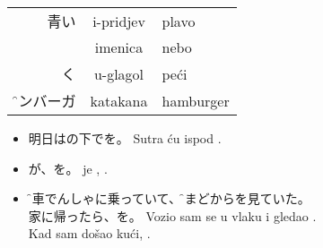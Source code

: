 \documentclass[pig]{grampig}
\begin{document}
	\begin{minipage}{\width}
		\onehalfspacing
%		
%		
%		
		
		\begin{table}
			\centering
			\textsc{} \br
			\begin{tabular}{RCl}
				青い & i-pridjev & plavo \\
				 & imenica & nebo \\
				く & u-glagol & peći \\
				\f{ハンバーガ}{\strut} & katakana & hamburger \\
			\end{tabular}
		\end{table} \vspace{-1em}
		
		\singlespacing
		\begin{itemize}
			\item 明日はの下でを。\bh
			Sutra ću ispod  . \\[-0.5em]
			
			\item {}が、を。\bh
			 je , . \\[-0.5em]
			
			\item {}\f{電車}{でんしゃ}に乗っていて、\f{窓}{まど}からを見ていた。\\
			家に帰ったら、を。\bh
			Vozio sam se u  vlaku i gledao . \\
			Kad sam došao kući, . 
		\end{itemize}　\vspace{-1.5em}
	
		\begin{center}
		\end{center}
	\end{minipage}
\end{document}
